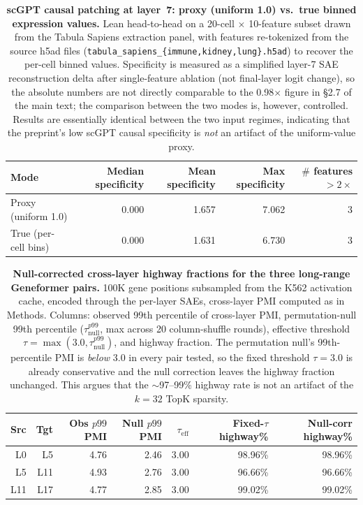 \documentclass[onecolumn]{article}
\begin{document}
\begin{table}[H]
\centering
\caption{\textbf{scGPT causal patching at layer~7: proxy (uniform 1.0) vs.\ true binned expression values.} Lean head-to-head on a 20-cell $\times$ 10-feature subset drawn from the Tabula Sapiens extraction panel, with features re-tokenized from the source h5ad files (\texttt{tabula\_sapiens\_\{immune,kidney,lung\}.h5ad}) to recover the per-cell binned values. Specificity is measured as a simplified layer-7 SAE reconstruction delta after single-feature ablation (not final-layer logit change), so the absolute numbers are not directly comparable to the 0.98$\times$ figure in \S2.7 of the main text; the comparison between the two modes is, however, controlled. Results are essentially identical between the two input regimes, indicating that the preprint's low scGPT causal specificity is \emph{not} an artifact of the uniform-value proxy.}
\label{tab:causal_true}
\smallskip
\small
\begin{tabular}{lrrrr}
\toprule
Mode & Median specificity & Mean specificity & Max specificity & $\#$ features $>2\times$ \\
\midrule
Proxy (uniform 1.0)      & 0.000 & 1.657 & 7.062 & 3 \\
True (per-cell bins) & 0.000 & 1.631 & 6.730 & 3 \\
\bottomrule
\end{tabular}
\end{table}


\begin{table}[H]
\centering
\caption{\textbf{Null-corrected cross-layer highway fractions for the three long-range Geneformer pairs.} 100K gene positions subsampled from the K562 activation cache, encoded through the per-layer SAEs, cross-layer PMI computed as in Methods. Columns: observed 99th percentile of cross-layer PMI, permutation-null 99th percentile ($\tau_{\text{null}}^{p99}$, max across 20 column-shuffle rounds), effective threshold $\tau = \max(3.0, \tau_{\text{null}}^{p99})$, and highway fraction. The permutation null's 99th-percentile PMI is \emph{below} 3.0 in every pair tested, so the fixed threshold $\tau{=}3.0$ is already conservative and the null correction leaves the highway fraction unchanged. This argues that the $\sim$97--99\% highway rate is not an artifact of the $k{=}32$ TopK sparsity.}
\label{tab:highways_null}
\smallskip
\small
\begin{tabular}{rrrrrrr}
\toprule
Src & Tgt & Obs $p99$ PMI & Null $p99$ PMI & $\tau_\text{eff}$ & Fixed-$\tau$ highway\% & Null-corr highway\% \\
\midrule
L0  & L5  & 4.76 & 2.46 & 3.00 & 98.96\% & 98.96\% \\
L5  & L11 & 4.93 & 2.76 & 3.00 & 96.66\% & 96.66\% \\
L11 & L17 & 4.77 & 2.85 & 3.00 & 99.02\% & 99.02\% \\
\bottomrule
\end{tabular}
\end{table}
\end{document}
